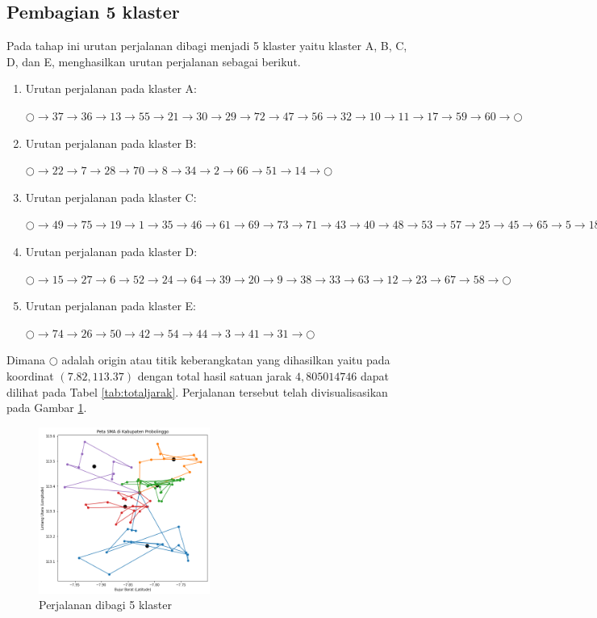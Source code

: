 \subsection{Pembagian 5 klaster}

Pada tahap ini urutan perjalanan dibagi menjadi 5 klaster yaitu klaster A, B, C, D, dan E, menghasilkan urutan perjalanan sebagai berikut.

\begin{enumerate}

\item Urutan perjalanan pada klaster A:

$\bigcirc \to 37 \to 36 \to 13 \to 55 \to 21 \to 30 \to 29 \to 72 \to 47 \to 56 \to 32 \to 10 \to 11 \to 17 \to 59 \to 60 \to \bigcirc$

\item Urutan perjalanan pada klaster B:

$\bigcirc \to 22 \to 7 \to 28 \to 70 \to 8 \to 34 \to 2 \to 66 \to 51 \to 14 \to \bigcirc$

\item Urutan perjalanan pada klaster C:

$\bigcirc \to 49 \to 75 \to 19 \to 1 \to 35 \to 46 \to 61 \to 69 \to 73 \to 71 \to 43 \to 40 \to 48 \to 53 \to 57 \to 25 \to 45 \to 65 \to 5 \to 18 \to 68 \to 16 \to 4 \to 62 \to \bigcirc$

\item Urutan perjalanan pada klaster D:

$\bigcirc \to 15 \to 27 \to 6 \to 52 \to 24 \to 64 \to 39 \to 20 \to 9 \to 38 \to 33 \to 63 \to 12 \to 23 \to 67 \to 58 \to \bigcirc$

\item Urutan perjalanan pada klaster E:

$\bigcirc \to 74 \to 26 \to 50 \to 42 \to 54 \to 44 \to 3 \to 41 \to 31 \to \bigcirc$

\end{enumerate}

Dimana $\bigcirc$ adalah origin atau titik keberangkatan yang dihasilkan yaitu pada koordinat $(7.82, 113.37)$ dengan total hasil satuan jarak $4,805014746$ dapat dilihat pada Tabel \ref{tab:totaljarak}. Perjalanan tersebut telah divisualisasikan pada Gambar \ref{fig:hasil_mtsp5}.

\begin{figure}[H]
\centering
\includegraphics[width=0.5\textwidth]{Gambar/hasil_mtsp/5}
\caption{Perjalanan dibagi 5 klaster}
\label{fig:hasil_mtsp5}
\end{figure}

